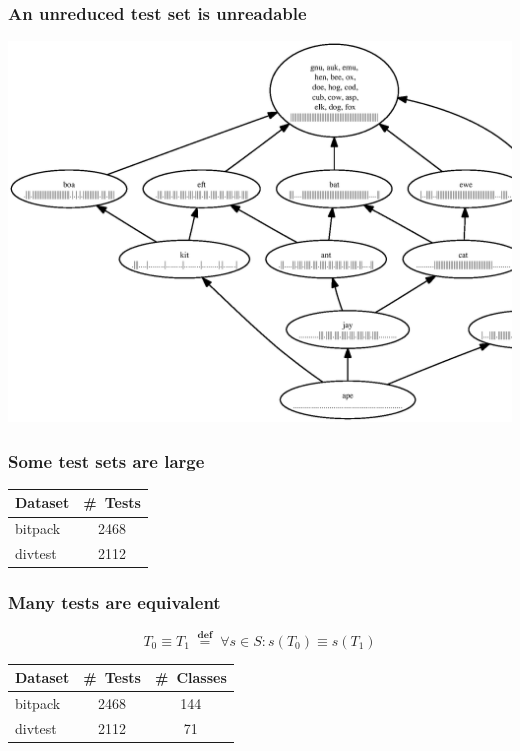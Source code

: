 \documentclass[svgnames,14pt]{beamer}
\newcommand\defined{\mathrel{\;\stackrel{\scriptscriptstyle\mathbf{def}}{=}\;}}
\theoremstyle{definition}
\begin{document}
\begin{frame}
\frametitle{An unreduced test set is unreadable}
\centerline{\includegraphics[height=0.9\textheight]{fail.ps}}
\end{frame}

\begin{frame}
\frametitle{Some test sets are large}
\begin{center}
\begin{tabular}{ | l | c | }
\hline
Dataset & \#~Tests \\ 
\hline
bitpack & 2468 \\
divtest & 2112 \\
\hline
\end{tabular}
\end{center}
\end{frame}

\begin{frame}
\frametitle{Many tests are equivalent}
\begin{block}{}
$$ T_0 \equiv T_1 \defined \forall s \in S : s(T_0) \equiv s(T_1) $$
\end{block}
\end{frame}

\begin{frame}
\def\?{\phantom0}
\begin{center}
\begin{tabular}{ | l | c | c | }
\hline
Dataset & \#~Tests & \#\ Classes\\ 
\hline
bitpack & 2468 & 144 \\
divtest & 2112 & \?71\\
\hline
\end{tabular}
\end{center}
\end{frame}
\end{document}
